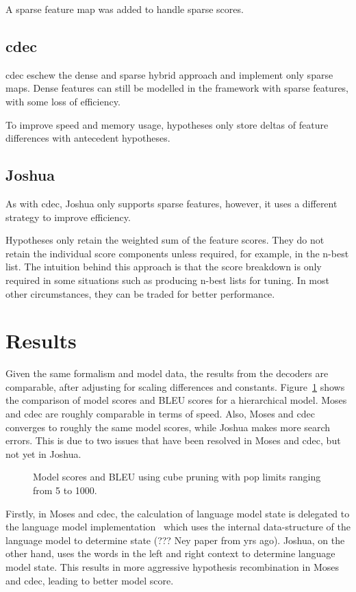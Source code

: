 \documentclass{pbml}
\begin{document}
A sparse feature map was added to handle sparse scores.

\subsection{cdec}
cdec eschew the dense and sparse hybrid approach and implement only sparse maps. Dense features can still be modelled in the framework with sparse features, with some loss of efficiency.

To improve speed and memory usage, hypotheses only store deltas of feature differences with antecedent hypotheses.

\subsection{Joshua}
As with cdec, Joshua only supports sparse features, however, it uses a different strategy to improve efficiency.

Hypotheses only retain the weighted sum of the feature scores. They do not retain the individual score components unless required, for example, in the n-best list. The intuition behind this approach is that the score breakdown is only required in some situations such as producing n-best lists for tuning. In most other circumstances, they can be traded for better performance.
  
\section{Results}

Given the same formalism and model data, the results from the decoders are comparable, after adjusting for scaling differences and constants. Figure~\ref{fig:model} shows the comparison of model scores and BLEU scores for a hierarchical model. Moses and cdec are roughly comparable in terms of speed. Also, Moses and cdec converges to roughly the same model scores, while Joshua makes more search errors. This is due to two issues that have been resolved in Moses and cdec, but not yet in Joshua.

\begin{figure}

\caption{\label{fig:model}Model scores and BLEU using cube pruning with pop limits ranging from 5 to 1000.}
\end{figure} 

Firstly, in Moses and cdec, the calculation of language model state is delegated to the language model implementation~\cite{Heafield-left} which uses the internal data-structure of the language model to determine state (??? Ney paper from yrs ago). Joshua, on the other hand, uses the words in the left and right context to determine language model state. This results in more aggressive hypothesis recombination in Moses and cdec, leading to better model score.
\end{document}
